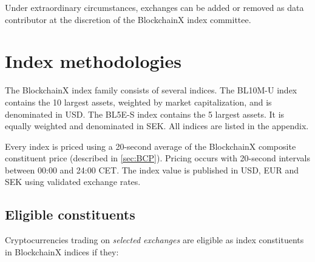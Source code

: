 \documentclass{article}
\begin{document}
Under extraordinary circumstances, exchanges can be added or removed as
data contributor at the discretion of the BlockchainX index committee.

\section{Index methodologies}\label{index-methodologies}

The BlockchainX index family consists of several indices. The BL10M-U
index contains the 10 largest assets, weighted by market capitalization,
and is denominated in USD. The BL5E-S index contains the 5 largest
assets. It is equally weighted and denominated in SEK. All indices are
listed in the appendix.

Every index is priced using a 20-second average of the BlockchainX
composite constituent price (described in \ref{sec:BCP}). Pricing occurs
with 20-second intervals between 00:00 and 24:00 CET. The index value is
published in USD, EUR and SEK using validated exchange rates.

\subsection{Eligible constituents}\label{sec:eligible-const}

Cryptocurrencies trading on \emph{selected exchanges} are eligible as
index constituents in BlockchainX indices if they:
\end{document}
